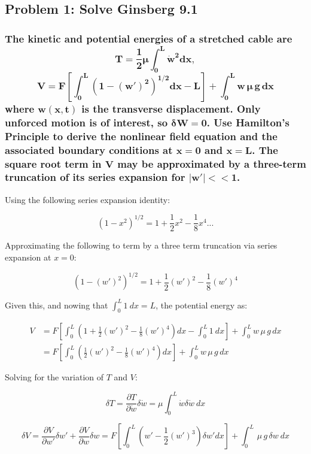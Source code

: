\documentclass[12pt, letterpaper]{../assignment}
\begin{document}
\subsection*{Problem 1: Solve Ginsberg 9.1}
\subsubsection*{The kinetic and potential energies of a stretched cable are
$$\bm{ T = \frac{1}{2}\mu \int_0^L \dot{w}^2 dx }, $$
$$\bm{ V = F \left[ \int_0^L \left( 1 - (w')^2 \right)^{1/2} dx - L \right] + \int_0^L w\,\mu\,g\, dx }$$
where $\bm{w(x,t)}$ is the transverse displacement.
Only unforced motion is of interest,
so $\bm{\delta W = 0}$.
Use Hamilton's Principle to derive the nonlinear field equation and the associated boundary conditions at $\bm{x = 0}$ and $\bm{x = L}$. 
The square root term in $\bm{V}$ may be approximated by a three-term truncation of its series expansion for $\bm{|w'| << 1}$.}

Using the following series expansion identity:

$$ \left( 1 - x^2 \right)^{1/2} = 1 + \frac{1}{2}x^2 - \frac{1}{8}x^4 ... $$


Approximating the following to term by a three term truncation via series expansion at $x = 0$:

$$ \left( 1 - (w')^2 \right)^{1/2} = 1 + \frac{1}{2}(w')^2 - \frac{1}{8}(w')^4 $$

Given this, and nowing that $\int_0^L 1\ dx = L$, the potential energy as:

\begin{equation*}
  \begin{aligned}
    V &= F \left[ \int_0^L \left( 1 + \frac{1}{2}(w')^2 - \frac{1}{8}(w')^4 \right) dx - \int_0^L 1\ dx \right] + \int_0^L w\,\mu\,g\, dx\\
      &= F \left[ \int_0^L \left( \frac{1}{2}(w')^2 - \frac{1}{8}(w')^4 \right) dx \right] + \int_0^L w\,\mu\,g\, dx
  \end{aligned}
\end{equation*}

Solving for the variation of $T$ and $V$:

$$ \delta T =
\frac{\partial T}{ \partial \dot{w}} \delta \dot{w} = 
\mu \int_0^L \dot{w} \delta \dot{w}\ dx $$

$$ \delta V = 
\frac{\partial V}{ \partial w'} \delta w' + \frac{\partial V}{ \partial w} \delta w  = 
F \left[ \int_0^L \left( w' - \frac{1}{2}(w')^3 \right)\delta w' dx \right] + \int_0^L \,\mu\,g\,\delta w\ dx $$
\end{document}

